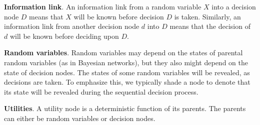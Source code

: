 \documentclass{article}
\begin{document}
\begin{theorem}
    \textbf{Information link}. An information link from a random variable $X$ into a decision node $D$ means that $X$ will be known before decision $D$ is taken. Similarly, an information link from another decision node $d$ into $D$ means that the decision of $d$ will be known before deciding upon $D$.
    \begin{center}
    \end{center}
\end{theorem}
\begin{theorem}
    \textbf{Random variables}. Random variables may depend on the states of parental random variables (as in Bayesian networks), but they also might depend on the state of decision nodes. The states of some random variables will be revealed, as decisions are taken. To emphasize this, we typically shade a node to denote that its state will be revealed during the sequential decision process.  
    \begin{center}
    \end{center}
\end{theorem}
\begin{theorem}
    \textbf{Utilities}. A utility node is a deterministic function of its parents. The parents can either be random variables or decision nodes.   
    
    \begin{center}
    \end{center}
\end{theorem}
\end{document}

